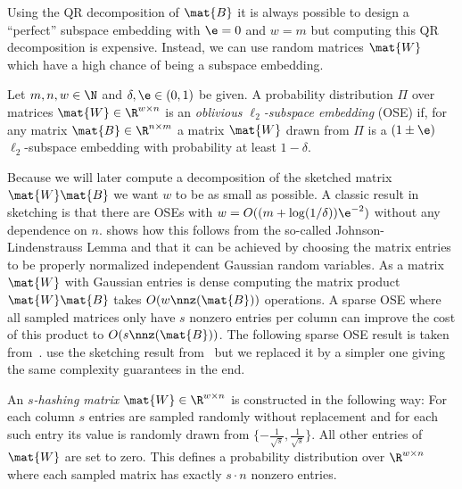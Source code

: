 Using the QR decomposition of \(\mat{B}\) it is always possible to design a \enquote{perfect} subspace embedding with \(\e = 0\) and \(w = m\)
but computing this QR decomposition is expensive.
Instead, we can use random matrices \(\mat{W}\) which have a high chance of being a subspace embedding.

\begin{definition}\label{def:oblivious-subspace-embedding}
Let \(m, n, w \in \N\) and \(\delta, \e \in (0, 1)\) be given.
A probability distribution \(\Pi\) over matrices \(\mat{W} \in \R^{w \times n}\) is an \emph{oblivious \(\ell_2\)-subspace embedding} (OSE) if, for any matrix \(\mat{B} \in \R^{n \times m}\) a matrix \(\mat{W}\) drawn from \(\Pi\) is a \((1\pm\e)\) \(\ell_2\)-subspace embedding with probability at least \(1 - \delta\).
\end{definition}

Because we will later compute a decomposition of the sketched matrix \(\mat{W}\mat{B}\) we want \(w\) to be as small as possible.
A classic result in sketching is that there are OSEs with \(w = O((m + \log(1/\delta))\e^{-2})\) without any dependence on \(n\).
\Textcite[Theorem 6]{Woodruff-Sketching} shows how this follows from the so-called Johnson-Lindenstrauss Lemma and that it can be achieved by choosing the matrix entries to be properly normalized independent Gaussian random variables.
As a matrix \(\mat{W}\) with Gaussian entries is dense computing the matrix product \(\mat{W}\mat{B}\) takes \(O(w \nnz(\mat{B}))\) operations.
A sparse OSE where all sampled matrices only have \(s\) nonzero entries per column can improve the cost of this product to \(O(s \nnz(\mat{B}))\).
The following sparse OSE result is taken from~\cite{Cohen-NearlyTightObliviousSubspaceEmbeddings}.
\Textcite{Avron-FasterRandomizedInfeasibleIPMs} use the sketching result from~\cite{Cohen-OptimalApproximateMatrixProduct} but we replaced it by a simpler one giving the same complexity guarantees in the end.

\begin{definition}\label{def:s-hashing-matrix}
An \emph{\(s\)-hashing matrix} \(\mat{W} \in \R^{w \times n}\) is constructed in the following way:
For each column \(s\) entries are sampled randomly without replacement and for each such entry its value is randomly drawn from \(\{ - \frac{1}{\sqrt{s}}, \frac{1}{\sqrt{s}} \}\).
All other entries of \(\mat{W}\) are set to zero.
This defines a probability distribution over \(\R^{w \times n}\) where each sampled matrix has exactly \(s \cdot n\) nonzero entries.
\end{definition}

